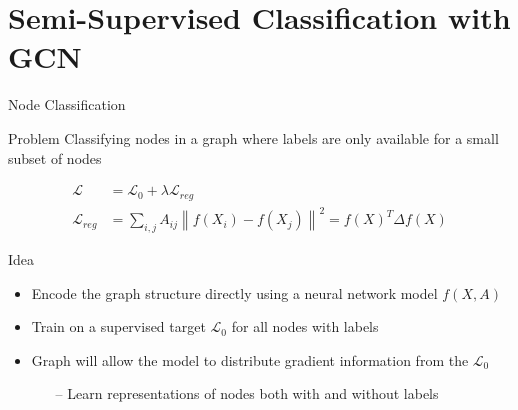 \documentclass{beamer}
\begin{document}
\section{Semi-Supervised Classification with GCN}
\begin{frame}{Node Classification}
  \small{
    \begin{block}{Problem}
      Classifying nodes in a graph where labels are only available for a
      small subset of nodes
    \end{block}
    \begin{align*}
      \mathcal{L} &= \mathcal{L}_0+\lambda\mathcal{L}_{reg} \\
      \mathcal{L}_{reg} &= \sum _{ i,j }^{  }{ { A }_{ ij }{ \left\| f({ X }_{ i })-f({ X }_{ j }) \right\|  }^{ 2 } } ={ f(X) }^{ T }\Delta f(X)
  \end{align*}
    \begin{block}{Idea}
      \begin{itemize}
      \item Encode the graph structure directly using a neural network
        model $f(X, A)$
      \item Train on a supervised target $\mathcal{L}_0$ for all nodes with labels
      \item Graph will allow the model to distribute gradient
        information from the $\mathcal{L}_0$
        \begin{itemize}
        \item[--] Learn representations of nodes both with and without labels
        \end{itemize}
      \end{itemize}
    \end{block}
  }
\end{frame}
\end{document}
